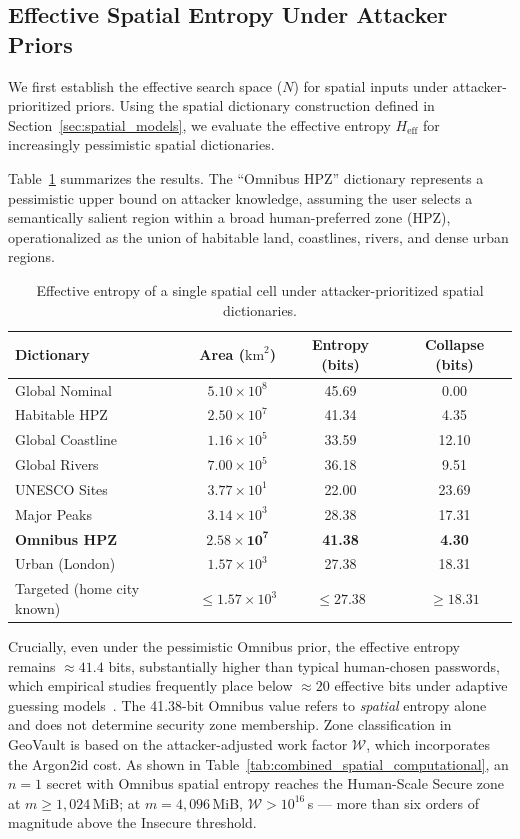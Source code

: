 \documentclass[journal,article,accept,pdftex,moreauthors]{Definitions/mdpi}
\begin{document}
\subsection{Effective Spatial Entropy Under Attacker Priors}
\label{sec:entropy_floors}

We first establish the effective search space ($N$) for spatial inputs under attacker-prioritized priors. Using the spatial dictionary construction defined in Section~\ref{sec:spatial_models}, we evaluate the effective entropy $H_{\text{eff}}$ for increasingly pessimistic spatial dictionaries.

Table~\ref{tab:entropy_dictionaries} summarizes the results. The ``Omnibus HPZ'' dictionary represents a pessimistic upper bound on attacker knowledge, assuming the user selects a semantically salient region within a broad human-preferred zone (HPZ), operationalized as the union of habitable land, coastlines, rivers, and dense urban regions.

\begin{table}[H]
\caption{Effective entropy of a single spatial cell under attacker-prioritized spatial dictionaries.}
\label{tab:entropy_dictionaries}
\centering
\begin{tabular}{lccc}
\toprule
\textbf{Dictionary} & \textbf{Area ($\text{km}^2$)} & \textbf{Entropy (bits)} & \textbf{Collapse (bits)} \\
\midrule
Global Nominal & $5.10\times10^{8}$ & 45.69 & 0.00 \\
Habitable HPZ & $2.50\times10^{7}$ & 41.34 & 4.35 \\
Global Coastline & $1.16\times10^{5}$ & 33.59 & 12.10 \\
Global Rivers & $7.00\times10^{5}$ & 36.18 & 9.51 \\
UNESCO Sites & $3.77\times10^{1}$ & 22.00 & 23.69 \\
Major Peaks & $3.14\times10^{3}$ & 28.38 & 17.31 \\
\textbf{Omnibus HPZ} & $\mathbf{2.58\times10^{7}}$ & \textbf{41.38} & \textbf{4.30} \\
Urban (London) & $1.57\times10^{3}$ & 27.38 & 18.31 \\
Targeted (home city known) & $\le 1.57\times10^{3}$ & $\le 27.38$ & $\ge 18.31$ \\
\bottomrule
\end{tabular}
\end{table}

Crucially, even under the pessimistic Omnibus prior, the effective entropy remains $\approx 41.4$ bits, substantially higher than typical human-chosen passwords, which empirical studies frequently place below $\approx 20$ effective bits under adaptive guessing models~\cite{Bonneau2012}. The 41.38-bit Omnibus value refers to \emph{spatial} entropy alone and does not determine security zone membership. Zone classification in GeoVault is based on the attacker-adjusted work factor $\mathcal{W}$, which incorporates the Argon2id cost. As shown in Table~\ref{tab:combined_spatial_computational}, an $n=1$ secret with Omnibus spatial entropy reaches the Human-Scale Secure zone at $m \geq 1{,}024$\,MiB; at $m=4{,}096$\,MiB, $\mathcal{W} > 10^{16}$\,s --- more than six orders of magnitude above the Insecure threshold.
\end{document}
